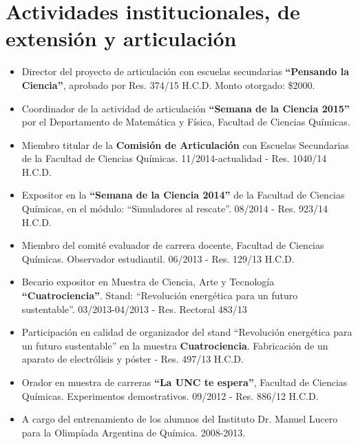 \documentclass[10pt]{article}
\begin{document}
\section{Actividades institucionales, de extensión y articulación}
\begin{itemize}
 \item Director del proyecto de articulación con escuelas secundarias {\bf ``Pensando la Ciencia''}, aprobado por Res. 374/15 H.C.D. Monto otorgado: \$2000.
 \item Coordinador de la actividad de articulación {\bf ``Semana de la Ciencia 2015''} por el Departamento de Matemática y Física, Facultad de Ciencias Químicas.
 \item Miembro titular de la {\bf Comisión de Articulación} con Escuelas Secundarias de la Facultad de Ciencias Químicas.  11/2014-actualidad - Res. 1040/14 H.C.D.
 \item Expositor en la {\bf ``Semana de la Ciencia 2014''} de la Facultad de Ciencias Químicas, en el módulo: ``Simuladores al rescate''. 08/2014 - Res. 923/14 H.C.D. 
 \item { Miembro del comité evaluador de carrera docente}, Facultad de Ciencias Químicas. Observador estudiantil. 06/2013 - Res. 129/13 H.C.D. 
 \item  Becario expositor en Muestra de Ciencia, Arte y Tecnología {\bf ``Cuatrociencia''}. Stand: ``Revolución energética para un futuro sustentable''. 03/2013-04/2013 - Res. Rectoral 483/13 
 \item Participación en calidad de organizador del stand ``Revolución energética para un futuro sustentable'' en la muestra {\bf Cuatrociencia}. Fabricación de un aparato de electrólisis y póster - Res. 497/13 H.C.D.
 \item Orador en muestra de carreras {\bf ``La UNC te espera''}, Facultad de Ciencias Químicas. Experimentos demostrativos. 09/2012 - Res. 886/12 H.C.D.
 \item A cargo del entrenamiento de los alumnos del Instituto Dr. Manuel Lucero para la Olimpíada Argentina de Química. 2008-2013.
 \end{itemize}
 
\end{document}
